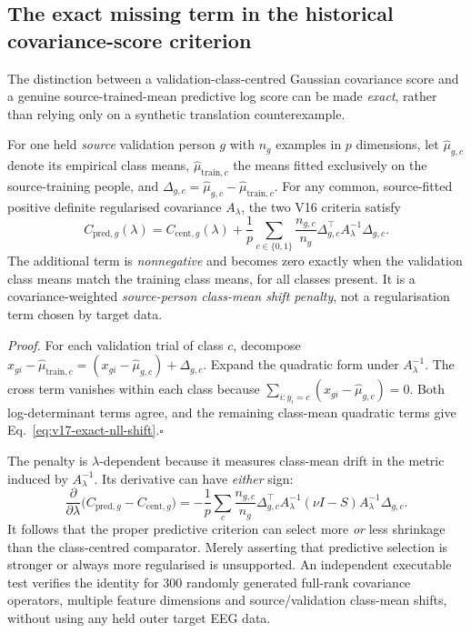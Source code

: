 \subsection{The exact missing term in the historical covariance-score criterion}
\label{sec:v17-mean-shift-decomposition}
The distinction between a validation-class-centred Gaussian
covariance score and a genuine source-trained-mean predictive
log score can be made \emph{exact}, rather than relying only
on a synthetic translation counterexample.

For one held \emph{source} validation person $g$ with $n_g$
examples in $p$ dimensions, let
$\widehat\mu_{g,c}$ denote its empirical class means,
$\widehat\mu_{\mathrm{train},c}$ the means fitted exclusively
on the source-training people, and
$\Delta_{g,c}=\widehat\mu_{g,c}-
\widehat\mu_{\mathrm{train},c}$. For any common,
source-fitted positive definite regularised covariance
$A_\lambda$, the two V16 criteria satisfy
\begin{equation}
\boxed{
 C_{\mathrm{pred},g}(\lambda)
 =
 C_{\mathrm{cent},g}(\lambda)
 +\frac{1}{p}\sum_{c\in\{0,1\}}
 \frac{n_{g,c}}{n_g}
 \Delta_{g,c}^\top A_\lambda^{-1}\Delta_{g,c}.
}
\label{eq:v17-exact-nll-shift}
\end{equation}
The additional term is \emph{nonnegative} and
becomes zero exactly when the validation class means
match the training class means, for all classes present.
It is a covariance-weighted \emph{source-person
class-mean shift penalty}, not a regularisation
term chosen by target data.

\emph{Proof.} For each validation trial of class $c$,
decompose
$x_{gi}-\widehat\mu_{\mathrm{train},c}=
(x_{gi}-\widehat\mu_{g,c})+\Delta_{g,c}$.
Expand the quadratic form under $A_\lambda^{-1}$.
The cross term vanishes within each class because
$\sum_{i:y_i=c}(x_{gi}-\widehat\mu_{g,c})=0$.
Both log-determinant terms agree, and the remaining
class-mean quadratic terms give
Eq.~\eqref{eq:v17-exact-nll-shift}.\hfill$\square$

The penalty is $\lambda$-dependent because it measures
class-mean drift in the metric induced by $A_\lambda^{-1}$.
Its derivative can have \emph{either} sign:
\[
 \frac{\partial}{\partial\lambda}
 \bigl(C_{\mathrm{pred},g}-C_{\mathrm{cent},g}\bigr)
 =-\frac1p\sum_c\frac{n_{g,c}}{n_g}
 \Delta_{g,c}^\top A_\lambda^{-1}
 (\nu I-S)A_\lambda^{-1}\Delta_{g,c}.
\]
It follows that the proper predictive criterion
can select more \emph{or} less shrinkage than
the class-centred comparator. Merely asserting
that predictive selection is stronger or always
more regularised is unsupported. An independent
executable test verifies the identity for 300
randomly generated full-rank covariance operators,
multiple feature dimensions and source/validation
class-mean shifts, without using any held outer
target EEG data.

